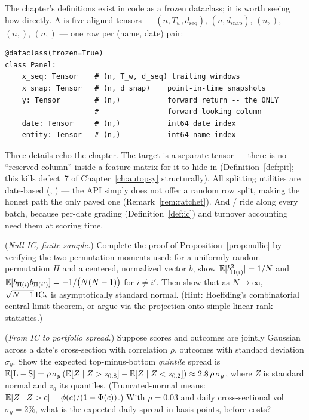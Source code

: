 \begin{codewalk}
The chapter's definitions exist in code as a frozen dataclass; it is worth
seeing how directly. A  is five aligned tensors ---
 $(n, T_w, d_{\text{seq}})$, 
$(n, d_{\text{snap}})$,  $(n,)$,  $(n,)$, 
$(n,)$ --- one row per (name, date) pair:

\begin{lstlisting}
@dataclass(frozen=True)
class Panel:
    x_seq: Tensor    # (n, T_w, d_seq) trailing windows
    x_snap: Tensor   # (n, d_snap)    point-in-time snapshots
    y: Tensor        # (n,)           forward return -- the ONLY
                     #                forward-looking column
    date: Tensor     # (n,)           int64 date index
    entity: Tensor   # (n,)           int64 name index
\end{lstlisting}

Three details echo the chapter. The target is a separate tensor --- there is
no ``reserved column'' inside a feature matrix for it to hide in
(Definition~\ref{def:pit}; this kills defect~7 of
Chapter~\ref{ch:autopsy} structurally). All splitting utilities are
date-based (, ) --- the API simply
does not offer a random row split, making the honest path the only paved one
(Remark~\ref{rem:ratchet}). And / ride along every
batch, because per-date grading (Definition~\ref{def:ic}) and turnover
accounting need them at scoring time.
\end{codewalk}

\exercisehead

\begin{exercise}\label{ex:1-null}
(\emph{Null IC, finite-sample.}) Complete the proof of
Proposition~\ref{prop:nullic} by verifying the two permutation moments used:
for a uniformly random permutation $\Pi$ and a centered, normalized vector
$b$, show $\mathbb{E}[b_{\Pi(i)}^2] = 1/N$ and
$\mathbb{E}[b_{\Pi(i)}b_{\Pi(i')}] = -1/\bigl(N(N-1)\bigr)$ for $i \neq i'$. Then
show that as $N \to \infty$, $\sqrt{N-1}\,\mathrm{IC}_t$ is asymptotically standard
normal. (Hint: Hoeffding's combinatorial central limit theorem, or argue via
the projection onto simple linear rank statistics.)
\end{exercise}

\begin{exercise}\label{ex:1-quantile}
(\emph{From IC to portfolio spread.}) Suppose scores and outcomes are jointly
Gaussian across a date's cross-section with correlation $\rho$, outcomes with
standard deviation $\sigma_y$. Show the expected top-minus-bottom
\emph{quintile} spread is
$\mathbb{E}[\text{L}-\text{S}] = \rho\,\sigma_y\,
(\mathbb{E}[Z \mid Z > z_{0.8}] - \mathbb{E}[Z \mid Z < z_{0.2}])
\approx 2.8\,\rho\,\sigma_y$, where $Z$ is standard normal and $z_q$ its
quantiles. (Truncated-normal means: $\mathbb{E}[Z \mid Z > c] = \phi(c)/(1-\Phi(c))$.)
With $\rho = 0.03$ and daily cross-sectional vol $\sigma_y = 2\%$, what is
the expected daily spread in basis points, before costs?
\end{exercise}

